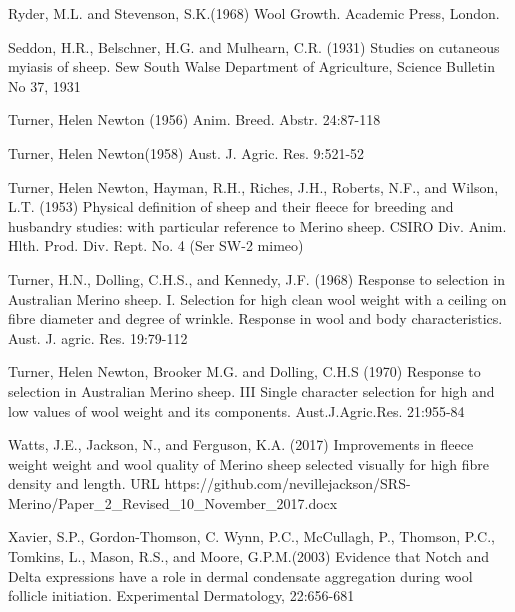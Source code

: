 \documentclass[titlepage]{article}  %
\begin{document}
\begin{thebibliography}{99}
Ryder, M.L. and Stevenson, S.K.(1968) Wool Growth. Academic Press, London.

Seddon, H.R., Belschner, H.G. and Mulhearn, C.R. (1931)  Studies on cutaneous myiasis of sheep. Sew South Walse Department of Agriculture, Science Bulletin No 37, 1931

Turner, Helen Newton (1956) Anim. Breed. Abstr. 24:87-118

Turner, Helen Newton(1958) Aust. J. Agric. Res. 9:521-52

Turner, Helen Newton, Hayman, R.H., Riches, J.H., Roberts, N.F., and Wilson, L.T. (1953) Physical definition of sheep and their fleece for breeding and husbandry studies: with particular reference to Merino sheep. CSIRO Div. Anim. Hlth. Prod. Div. Rept. No. 4 (Ser SW-2 mimeo)

Turner, H.N., Dolling, C.H.S., and Kennedy, J.F. (1968) Response to selection in Australian Merino sheep. I. Selection for high clean wool weight with a ceiling on fibre diameter and degree of wrinkle. Response in wool and body characteristics. Aust. J. agric. Res. 19:79-112

Turner, Helen Newton, Brooker M.G. and Dolling, C.H.S (1970) Response to selection in Australian Merino sheep. III Single character selection for high and low values of wool weight and its components. Aust.J.Agric.Res. 21:955-84

Watts, J.E., Jackson, N., and Ferguson, K.A. (2017) Improvements in fleece weight weight and wool quality of Merino sheep selected visually for high fibre density and length. URL https://github.com/nevillejackson/SRS-Merino/Paper\_2\_Revised\_10\_November\_2017.docx 

Xavier, S.P., Gordon-Thomson, C. Wynn, P.C., McCullagh, P., Thomson, P.C., Tomkins, L., Mason, R.S., and Moore, G.P.M.(2003) Evidence that Notch and Delta expressions have a role in dermal condensate aggregation during wool follicle initiation. Experimental Dermatology, 22:656-681

\end{thebibliography}
\end{document}
